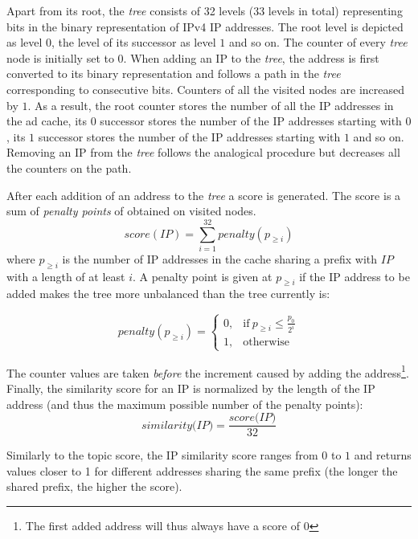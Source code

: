 Apart from its root,  the \emph{tree} consists of 32 levels (33 levels in total) representing bits in the binary representation of IPv4 IP addresses. 
The root level is depicted as level $0$, the level of its successor as level $1$ and so on. 
The counter of every \emph{tree} node is initially set to $0$. When adding an IP to the \emph{tree},  the address is first converted to its binary representation and follows a path in the \emph{tree} corresponding to consecutive bits. 
Counters of all the visited nodes are increased by $1$. 
As a result, the root counter stores the number of all the IP addresses in the ad cache, its $0$ successor stores the number of the IP addresses starting with $0$, its $1$ successor stores the number of the IP addresses starting with $1$ and so on. 
Removing an IP from the \emph{tree} follows the analogical procedure but decreases all the counters on the path. 

After each addition of an address to the \emph{tree} a score is generated.
The score is a sum of \emph{penalty points} of obtained on visited nodes. 
$$score(IP)=\sum_{i=1}^{32} \textit{penalty}(p_{\geq i}) $$
where $p_{\geq i}$ is the number of IP addresses in the cache sharing a prefix with $IP$ with a length of at least $i$. A penalty point is given at $p_{\geq i}$ if the IP address to be added makes the tree more unbalanced than the tree currently is:

\begin{equation}
    \textit{penalty}(p_{\geq i})=
    \begin{cases}
      0, & \text{if}\ p_{\geq i} \leq \frac{p_0}{2^i} \\
      1, & \text{otherwise}
    \end{cases}
  \end{equation}

The counter values are taken \emph{before} the increment caused by adding the address\footnote{The first added address will thus always have a score of $0$}. 
Finally, the similarity score for an IP is normalized by the length of the IP address (and thus the maximum possible number of the penalty points):
\begin{equation}
    \textit{similarity(IP}) = \frac{\textit{score(IP)}}{32}
\end{equation}

Similarly to the topic score, the IP similarity score ranges from $0$ to $1$ and returns values closer to 1 for different addresses sharing the same prefix (the longer the shared prefix, the higher the score).

